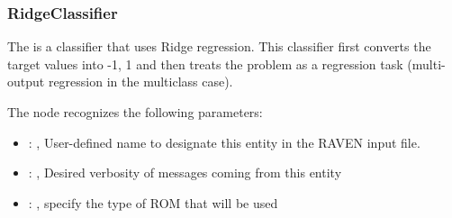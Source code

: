 \subsubsection{RidgeClassifier}
  The  is a classifier that uses Ridge regression.
  This classifier first converts the target values into {-1, 1} and then treats
  the problem as a regression task (multi-output regression in the multiclass case).

  The  node recognizes the following parameters:
    \begin{itemize}
      \item {}: ,
        User-defined name to designate this entity in the RAVEN input file.
      \item {}: ,
        Desired verbosity of messages coming from this entity
      \item {}: ,
        specify the type of ROM that will be used
  \end{itemize}

